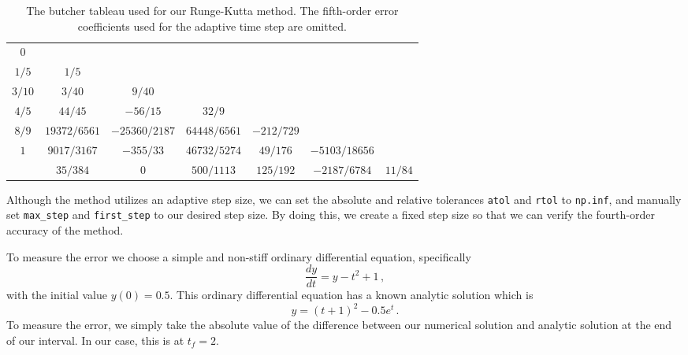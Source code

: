 	\begin{table}[H]
		\centering
		\begin{tabular}{c|cccccc}
			 \(0\)   &                &                 &                &              &                 &           \\
			\(1/5\)  &    \(1/5\)     &                 &                &              &                 &           \\
			\(3/10\) &    \(3/40\)    &    \(9/40\)     &                &              &                 &           \\
			\(4/5\)  &   \(44/45\)    &   \(-56/15\)    &    \(32/9\)    &              &                 &           \\
			\(8/9\)  & \(19372/6561\) & \(-25360/2187\) & \(64448/6561\) & \(-212/729\) &                 &           \\
			 \(1\)   & \(9017/3167\)  &   \(-355/33\)   & \(46732/5274\) &  \(49/176\)  & \(-5103/18656\) &           \\ \hline
			         &   \(35/384\)   &      \(0\)      &  \(500/1113\)  & \(125/192\)  & \(-2187/6784\)  & \(11/84\)
		\end{tabular}
		\caption{The butcher tableau used for our Runge-Kutta method. The fifth-order error coefficients used for the adaptive time step are omitted.}
		\label{table:prince-dormand-butcher}
	\end{table}
	
	Although the method utilizes an adaptive step size, we can set the absolute and relative tolerances \lstinline{atol} and \lstinline{rtol} to \lstinline{np.inf}, and manually set \lstinline{max_step} and \lstinline{first_step} to our desired step size. By doing this, we create a fixed step size so that we can verify the fourth-order accuracy of the method.
	
	To measure the error we choose a simple and non-stiff ordinary differential equation, specifically
	\begin{equation*}
		\frac{dy}{dt} = y - t^2 + 1\,,
	\end{equation*}
	with the initial value \(y(0) = 0.5\). This ordinary differential equation has a known analytic solution which is
	\begin{equation*}
		y = (t + 1)^2 - 0.5e^t \,.
	\end{equation*}
	To measure the error, we simply take the absolute value of the difference between our numerical solution and analytic solution at the end of our interval. In our case, this is at \(t_f=2\). 
	
